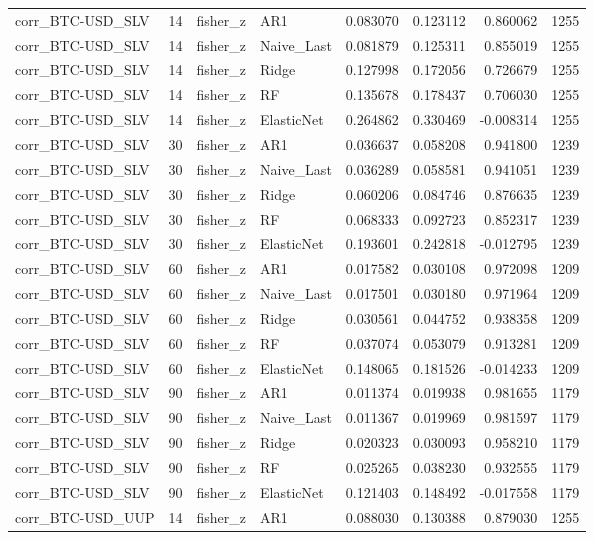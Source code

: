 \begin{table}
\begin{tabular}{lrllrrrr}
corr_BTC-USD_SLV & 14 & fisher_z & AR1 & 0.083070 & 0.123112 & 0.860062 & 1255 \\
corr_BTC-USD_SLV & 14 & fisher_z & Naive_Last & 0.081879 & 0.125311 & 0.855019 & 1255 \\
corr_BTC-USD_SLV & 14 & fisher_z & Ridge & 0.127998 & 0.172056 & 0.726679 & 1255 \\
corr_BTC-USD_SLV & 14 & fisher_z & RF & 0.135678 & 0.178437 & 0.706030 & 1255 \\
corr_BTC-USD_SLV & 14 & fisher_z & ElasticNet & 0.264862 & 0.330469 & -0.008314 & 1255 \\
corr_BTC-USD_SLV & 30 & fisher_z & AR1 & 0.036637 & 0.058208 & 0.941800 & 1239 \\
corr_BTC-USD_SLV & 30 & fisher_z & Naive_Last & 0.036289 & 0.058581 & 0.941051 & 1239 \\
corr_BTC-USD_SLV & 30 & fisher_z & Ridge & 0.060206 & 0.084746 & 0.876635 & 1239 \\
corr_BTC-USD_SLV & 30 & fisher_z & RF & 0.068333 & 0.092723 & 0.852317 & 1239 \\
corr_BTC-USD_SLV & 30 & fisher_z & ElasticNet & 0.193601 & 0.242818 & -0.012795 & 1239 \\
corr_BTC-USD_SLV & 60 & fisher_z & AR1 & 0.017582 & 0.030108 & 0.972098 & 1209 \\
corr_BTC-USD_SLV & 60 & fisher_z & Naive_Last & 0.017501 & 0.030180 & 0.971964 & 1209 \\
corr_BTC-USD_SLV & 60 & fisher_z & Ridge & 0.030561 & 0.044752 & 0.938358 & 1209 \\
corr_BTC-USD_SLV & 60 & fisher_z & RF & 0.037074 & 0.053079 & 0.913281 & 1209 \\
corr_BTC-USD_SLV & 60 & fisher_z & ElasticNet & 0.148065 & 0.181526 & -0.014233 & 1209 \\
corr_BTC-USD_SLV & 90 & fisher_z & AR1 & 0.011374 & 0.019938 & 0.981655 & 1179 \\
corr_BTC-USD_SLV & 90 & fisher_z & Naive_Last & 0.011367 & 0.019969 & 0.981597 & 1179 \\
corr_BTC-USD_SLV & 90 & fisher_z & Ridge & 0.020323 & 0.030093 & 0.958210 & 1179 \\
corr_BTC-USD_SLV & 90 & fisher_z & RF & 0.025265 & 0.038230 & 0.932555 & 1179 \\
corr_BTC-USD_SLV & 90 & fisher_z & ElasticNet & 0.121403 & 0.148492 & -0.017558 & 1179 \\
corr_BTC-USD_UUP & 14 & fisher_z & AR1 & 0.088030 & 0.130388 & 0.879030 & 1255 \\

\end{tabular}
\end{table}
